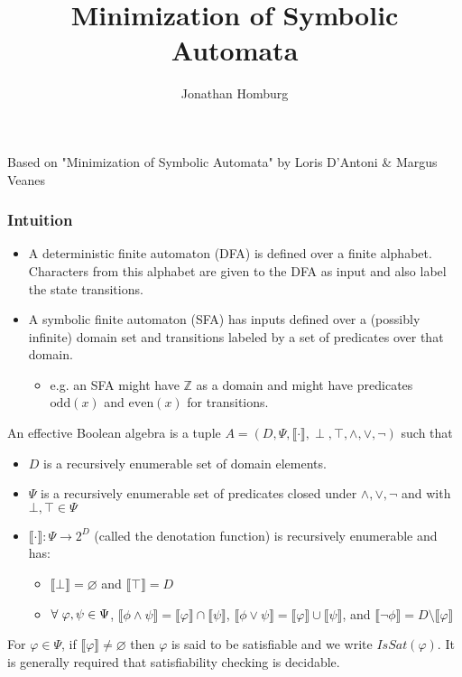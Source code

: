 \documentclass[12pt]{beamer}
\title{Minimization of Symbolic Automata}
\author{Jonathan Homburg}
\date{}
\newcommand{\denotation}[1]{\llbracket #1 \rrbracket}
\begin{document}
\begin{frame}[plain]
\titlepage

Based on "Minimization of Symbolic Automata" by Loris D'Antoni \& Margus Veanes
\end{frame}

\begin{frame}
\frametitle{Intuition}
\begin{itemize}
\item A deterministic finite automaton (DFA) is defined over a finite alphabet. Characters from this alphabet are given to the DFA as input and also label the state transitions.
\item A symbolic finite automaton (SFA) has inputs defined over a (possibly infinite) domain set and transitions labeled by a set of predicates over that domain.
\begin{itemize}
\item e.g. an SFA might have $\mathbb{Z}$ as a domain and might have predicates $\text{odd}(x)$ and $\text{even}(x)$ for transitions.
\end{itemize}
\end{itemize}
\end{frame}

\begin{frame}
\begin{definition}
An \alert{effective Boolean algebra} is a tuple $A=(D, \Psi, \denotation{\cdot}, \perp, \top, \wedge, \vee, \neg)$ such that
\begin{itemize}
\item $D$ is a recursively enumerable set of domain elements.
\item $\Psi$ is a recursively enumerable set of predicates  closed under  $\wedge, \vee, \neg$ and with $\bot, \top \in \Psi$
\item $\denotation{\cdot} : \Psi \to 2^D$ (called the denotation function) is recursively enumerable and has:
\begin{itemize}
\item $\denotation{\bot} = \varnothing$ and $\denotation{\top} = D$
\item $\forall \hphantom l \varphi, \psi \in \Psi$, $\denotation{\phi \wedge \psi}= \denotation{\varphi}\cap\denotation{\psi}$, $\denotation{\phi \vee \psi} = \denotation{\varphi}\cup\denotation{\psi}$, and $\denotation{\neg \phi} = D \setminus \denotation{\varphi}$
\end{itemize}
\end{itemize}
\end{definition}
For $\varphi \in \Psi$, if $\denotation{\varphi} \neq \varnothing$ then $\varphi$ is said to be satisfiable and we write $IsSat(\varphi)$. It is generally required that satisfiability checking is decidable.
\end{frame}
\end{document}
